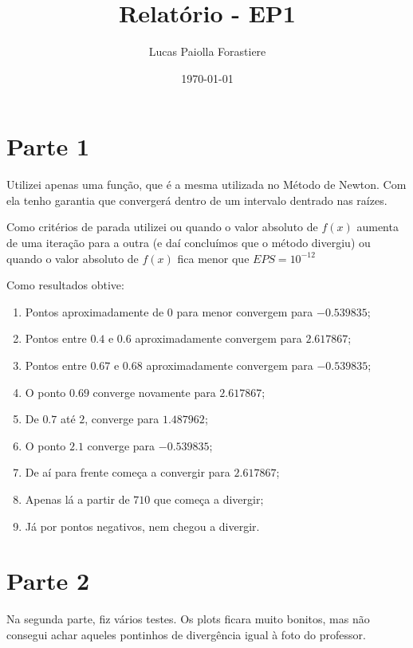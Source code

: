 \documentclass[12pt, a4paper, oneside]{article}
\title{Relatório - EP1}
\date{\today}
\author{Lucas Paiolla Forastiere}
\begin{document}
\maketitle


\section{Parte 1}

Utilizei apenas uma função, que é a mesma utilizada no Método de Newton.
Com ela tenho garantia que convergerá dentro de um intervalo dentrado
nas raízes. 

Como critérios de parada utilizei ou quando o valor absoluto de $f(x)$
aumenta de uma iteração para a outra (e daí concluímos que o método divergiu)
ou quando o valor absoluto de $f(x)$ fica menor que $EPS=10^{-12}$

Como resultados obtive:
\begin{enumerate}
    \item Pontos aproximadamente de $0$ para menor convergem 
    para $-0.539835$;
    \item Pontos entre $0.4$ e $0.6$ aproximadamente convergem para 
    $2.617867$;
    \item Pontos entre $0.67$ e $0.68$ aproximadamente convergem para
    $-0.539835$;
    \item O ponto $0.69$ converge novamente para $2.617867$;
    \item De $0.7$ até $2$, converge para $1.487962$;
    \item O ponto $2.1$ converge para  $-0.539835$;
    \item De aí para frente começa a convergir para $2.617867$;
    \item Apenas lá a partir de $710$ que começa a divergir;
    \item Já por pontos negativos, nem chegou a divergir.
\end{enumerate}

\section{Parte 2}

Na segunda parte, fiz vários testes. Os plots ficara muito bonitos, mas não consegui
achar aqueles pontinhos de divergência igual à foto do professor.
\end{document}

